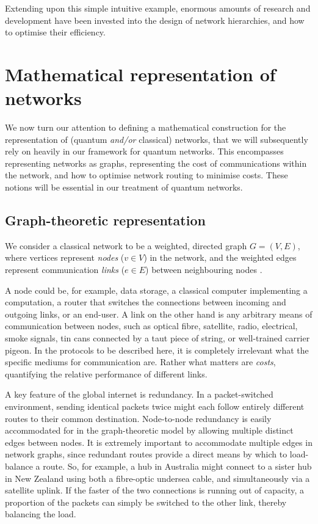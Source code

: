 \documentclass[aps,rmp,twocolumn,amsmath,amssymb,nofootinbib,superscriptaddress,longbibliography,floatfix]{revtex4-1}
\newcommand{\comment}[1]{{\color{blue}{\textbf{#1}}}}
\begin{document}
Extending upon this simple intuitive example, enormous amounts of research and development have been invested into the design of network hierarchies, and how to optimise their efficiency.

\comment{To do}

%
%

\section{Mathematical representation of networks}

We now turn our attention to defining a mathematical construction for the representation of (quantum \emph{and/or} classical) networks, that we will subsequently rely on heavily in our framework for quantum networks. This encompasses representing networks as graphs, representing the cost of communications within the network, and how to optimise network routing to minimise costs.  These notions will be essential in our treatment of quantum networks.

%
%

\subsection{Graph-theoretic representation}

We consider a classical network to be a weighted, directed graph \mbox{$G=(V,E)$}, where vertices represent \emph{nodes} (\mbox{$v\in V$}) in the network, and the weighted edges represent communication \emph{links} (\mbox{$e\in E$}) between neighbouring nodes \cite{???}.

A node could be, for example, data storage, a classical computer implementing a computation, a router that switches the connections between incoming and outgoing links, or an end-user. A link on the other hand is any arbitrary means of communication between nodes, such as optical fibre, satellite, radio, electrical, smoke signals, tin cans connected by a taut piece of string, or well-trained carrier pigeon. In the protocols to be described here, it is completely irrelevant what the specific mediums for communication are. Rather what matters are \emph{costs}, quantifying the relative performance of different links.

A key feature of the global internet is redundancy. In a packet-switched \cite{???} environment, sending identical packets twice might each follow entirely different routes to their common destination. Node-to-node redundancy is easily accommodated for in the graph-theoretic model by allowing multiple distinct edges between nodes. It is extremely important to accommodate multiple edges in network graphs, since redundant routes provide a direct means by which to load-balance a route. So, for example, a hub in Australia might connect to a sister hub in New Zealand using both a fibre-optic undersea cable, and simultaneously via a satellite uplink. If the faster of the two connections is running out of capacity, a proportion of the packets can simply be switched to the other link, thereby balancing the load.
\end{document}
